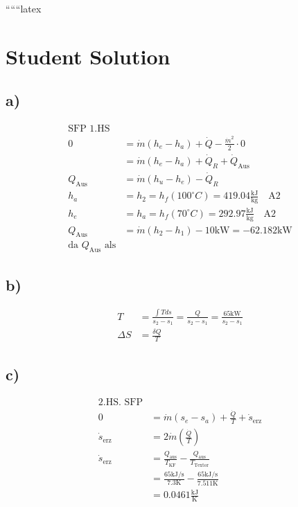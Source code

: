 
``````latex


\section*{Student Solution}

\subsection*{a)}
\begin{align*}
\text{SFP 1.HS} \\
0 &= \dot{m} (h_e - h_a) + \dot{Q} - \frac{\dot{m}^2}{2} \cdot 0 \\
&= \dot{m} (h_e - h_a) + \dot{Q}_R + \dot{Q}_{\text{Aus}} \\
Q_{\text{Aus}} &= \dot{m} (h_u - h_e) - \dot{Q}_R \\
h_a &= h_2 = h_f (100^\circ C) = 419.04 \frac{\text{kJ}}{\text{kg}} \quad \text{A2} \\
h_e &= h_a = h_f (70^\circ C) = 292.97 \frac{\text{kJ}}{\text{kg}} \quad \text{A2} \\
Q_{\text{Aus}} &= \dot{m} (h_2 - h_1) - 10 \text{kW} = -62.182 \text{kW} \\
\text{da } Q_{\text{Aus}} \text{ als}
\end{align*}

\subsection*{b)}
\begin{align*}
T &= \frac{\int T ds}{s_2 - s_1} = \frac{Q}{s_2 - s_1} = \frac{65 \text{kW}}{s_2 - s_1} \\
\Delta S &= \frac{\delta Q}{T}
\end{align*}

\subsection*{c)}
\begin{align*}
\text{2.HS. SFP} \\
0 &= \dot{m} (s_e - s_a) + \frac{\dot{Q}}{T} + \dot{s}_{\text{erz}} \\
\dot{s}_{\text{erz}} &= 2 \dot{m} \left( \frac{\dot{Q}}{T} \right) \\
\dot{s}_{\text{erz}} &= \frac{Q_{\text{aus}}}{T_{\text{KF}}} - \frac{Q_{\text{aus}}}{T_{\text{Textor}}} \\
&= \frac{65 \text{kJ/s}}{7.3 \text{K}} - \frac{65 \text{kJ/s}}{7.511 \text{K}} \\
&= 0.0461 \frac{\text{kJ}}{\text{K}}
\end{align*}


